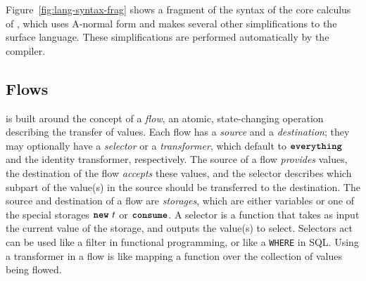 \documentclass[dvipsnames, usenames, sigconf]{acmart}
\begin{document}
Figure~\ref{fig:lang-syntax-frag} shows a fragment of the syntax of the core calculus of \langName, which uses A-normal form and makes several other simplifications to the surface \langName language.
These simplifications are performed automatically by the compiler.

\subsection{Flows}
\langName is built around the concept of a \emph{flow}, an atomic, state-changing operation describing the transfer of values.
Each flow has a \emph{source} and a \emph{destination}; they may optionally have a \emph{selector} or a \emph{transformer}, which default to $\textbf{\texttt{everything}}$ and the identity transformer, respectively.
The source of a flow \emph{provides} values, the destination of the flow \emph{accepts} these values, and the selector describes which subpart of the value(s) in the source should be transferred to the destination.
The source and destination of a flow are \emph{storages}, which are either variables or one of the special storages $\textbf{\texttt{new}}~t$ or $\textbf{\texttt{consume}}$.
A selector is a function that takes as input the current value of the storage, and outputs the value(s) to select.
Selectors act can be used like a filter in functional programming, or like a \lstinline{WHERE} in SQL.
Using a transformer in a flow is like mapping a function over the collection of values being flowed.
\end{document}
